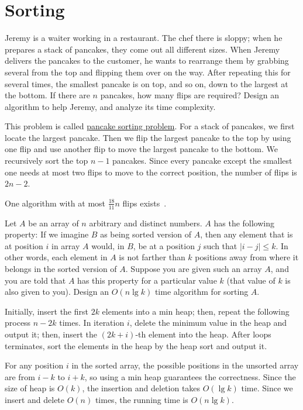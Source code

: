 \section{Sorting}

\begin{Exercise}
Jeremy is a waiter working in a restaurant. The chef there is sloppy; when he prepares a stack of pancakes, they come out all different sizes. When Jeremy delivers the pancakes to the customer, he wants to rearrange them by grabbing several from the top and flipping them over on the way. After repeating this for several times, the smallest pancake is on top, and so on, down to the largest at the bottom. If there are $n$ pancakes, how many flips are required? Design an algorithm to help Jeremy, and analyze its time complexity.  
\end{Exercise}
\begin{Answer}
This problem is called \href{https://en.wikipedia.org/wiki/Pancake_sorting}{pancake sorting problem}. For a stack of pancakes, we first locate the largest pancake. Then we flip the largest pancake to the top by using one flip and use another flip to move the largest pancake to the bottom. We recursively sort the top $n-1$ pancakes. Since every pancake except the smallest one needs at most two flips to move to the correct position, the number of flips is $2n - 2$.

One algorithm with at most $\frac{18}{11}n$ flips exists~\cite{Chitturi2009}.
\end{Answer}

\begin{Exercise}
Let $A$ be an array of $n$ arbitrary and distinct numbers. $A$ has the following property: If we imagine $B$ as being sorted version of $A$, then any element that is at position $i$ in array $A$ would, in $B$, be at a position $j$ such that $| i - j | \leq k$. In other words, each element in $A$ is not farther than $k$ positions away from where it belongs in the sorted version of $A$. Suppose you are given such an array $A$, and you are told that $A$ has this property for a particular value $k$ (that value of $k$ is also given to you). Design an $O(n \lg k)$ time algorithm for sorting $A$. 
\end{Exercise}
\begin{Answer}
Initially, insert the first $2k$ elements into a min heap; then, repeat the following process $n - 2k$ times. In iteration $i$, delete the minimum value in the heap and output it; then, insert the $(2k + i)$-th element into the heap. After loops terminates, sort the elements in the heap by the heap sort and output it.

For any position $i$ in the sorted array, the possible positions in the unsorted array are from $i - k$ to $i + k$, so using a min heap guarantees the correctness. 
Since the size of heap is $O(k)$, the insertion and deletion takes $O(\lg k)$ time. 
Since we insert and delete $O(n)$ times, the running time is $O(n \lg k)$.
\end{Answer}

